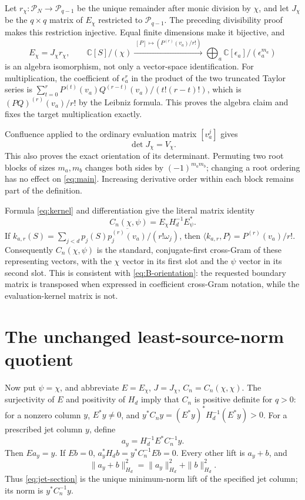 \documentclass[11pt]{article}
\newcommand{\C}{\mathbb C}
\newcommand{\Pp}{\mathcal P}
\begin{document}
Let \(r_\chi:\Pp_N\to\Pp_{q-1}\) be the unique remainder after monic
division by \(\chi\), and let \(J_\chi\) be the \(q\times q\) matrix
of \(E_\chi\) restricted to \(\Pp_{q-1}\). The preceding divisibility
proof makes this restriction injective. Equal finite dimensions make it
bijective, and
\begin{equation}\label{eq:E-factor}
 E_\chi=J_\chi r_\chi,
 \qquad
 \C[S]/(\chi)\xrightarrow{\ [P]\mapsto(P^{(r)}(v_a)/r!)\ }
 \bigoplus_a\C[\epsilon_a]/(\epsilon_a^{m_a})
\end{equation}
is an algebra isomorphism, not only a vector-space identification.
For multiplication, the coefficient of \(\epsilon_a^r\) in the product
of the two truncated Taylor series is
\(\sum_{t=0}^r P^{(t)}(v_a)Q^{(r-t)}(v_a)/(t!(r-t)!)\), which is
\((PQ)^{(r)}(v_a)/r!\) by the Leibniz formula. This proves the algebra
claim and fixes the target multiplication exactly.

Confluence applied to the ordinary evaluation matrix
\([v_a^j]\) gives
\begin{equation}\label{eq:detJ}
 \det J_\chi=V_\chi.
\end{equation}
This also proves the exact orientation of its determinant. Permuting two
root blocks of sizes \(m_a,m_b\) changes both sides by
\((-1)^{m_am_b}\); changing a root ordering has no effect on
\eqref{eq:main}. Increasing derivative order within each block remains
part of the definition.

Formula \eqref{eq:kernel} and differentiation give the literal matrix
identity
\begin{equation}\label{eq:C-matrix}
 C_n(\chi,\psi)=E_\chi H_d^{-1}E_\psi^*.
\end{equation}
If \(k_{a,r}(S)=\sum_{j<d}p_j(S)
\overline{p_j^{(r)}(v_a)}/(r!\omega_j)\), then
\(\langle k_{a,r},P\rangle=P^{(r)}(v_a)/r!\).
Consequently \(C_n(\chi,\psi)\) is the standard, conjugate-first
cross-Gram of these representing vectors, with the \(\chi\) vector
in its first slot and the \(\psi\) vector in its second slot.
This is consistent with \eqref{eq:B-orientation}: the requested boundary
matrix is transposed when expressed in coefficient cross-Gram notation,
while the evaluation-kernel matrix is not.

\section{The unchanged least-source-norm quotient}\label{sec:quotient}

Now put \(\psi=\chi\), and abbreviate
\(E=E_\chi\), \(J=J_\chi\), \(C_n=C_n(\chi,\chi)\).
The surjectivity of \(E\) and positivity of \(H_d\) imply that \(C_n\)
is positive definite for \(q>0\): for a nonzero column \(y\),
\(E^*y\ne0\), and \(y^*C_ny=(E^*y)^*H_d^{-1}(E^*y)>0\).
For a prescribed jet column \(y\), define
\begin{equation}\label{eq:jet-section}
 a_y=H_d^{-1}E^*C_n^{-1}y.
\end{equation}
Then \(Ea_y=y\). If \(Eb=0\),
\(a_y^*H_db=y^*C_n^{-1}Eb=0\). Every other lift is \(a_y+b\), and
\[
 \|a_y+b\|_{H_d}^2=\|a_y\|_{H_d}^2+\|b\|_{H_d}^2.
\]
Thus \eqref{eq:jet-section} is the unique minimum-norm lift of the
specified jet column; its norm is \(y^*C_n^{-1}y\).
\end{document}
